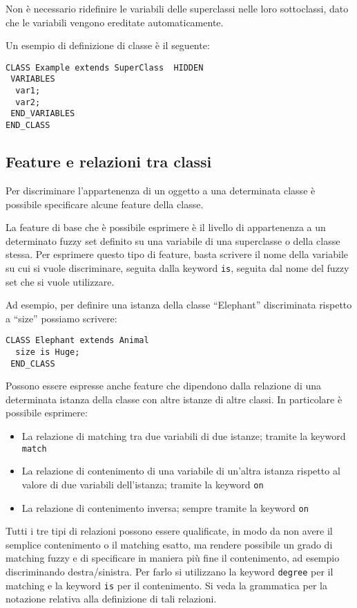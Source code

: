 Non è necessario ridefinire le variabili delle superclassi nelle loro sottoclassi, dato che le variabili vengono ereditate automaticamente.

Un esempio di definizione di classe è il seguente:

\begin{lstlisting}[language=fuzzyClassifier]
CLASS Example extends SuperClass  HIDDEN
 VARIABLES
  var1;
  var2;
 END_VARIABLES
END_CLASS
\end{lstlisting}


\subsection{Feature e relazioni tra classi}

Per discriminare l'appartenenza di un oggetto a una determinata classe è possibile specificare alcune feature della classe.

La feature di base che è possibile esprimere è il livello di appartenenza a un determinato fuzzy set definito su una variabile di una superclasse o della classe stessa. 
Per esprimere questo tipo di feature, basta scrivere il nome della variabile su cui si vuole discriminare, seguita dalla keyword \verb|is|, seguita dal nome del fuzzy set che si vuole utilizzare.

Ad esempio, per definire una istanza della classe ``Elephant'' discriminata rispetto a ``size'' possiamo scrivere:

\begin{lstlisting}[language=fuzzyClassifier]
 CLASS Elephant extends Animal
  size is Huge;
 END_CLASS
\end{lstlisting}


Possono essere espresse anche feature che dipendono dalla relazione di una determinata istanza della classe con altre istanze di altre classi.
In particolare è possibile esprimere:

\begin{itemize}
 \item La relazione di matching tra due variabili di due istanze; tramite la keyword \verb|match|
 \item La relazione di contenimento di una variabile di un'altra istanza rispetto al valore di due variabili dell'istanza; tramite la keyword \verb|on|
 \item La relazione di contenimento inversa; sempre tramite la keyword \verb|on|
\end{itemize}

Tutti i tre tipi di relazioni possono essere qualificate, in modo da non avere il semplice contenimento o il matching esatto, ma rendere possibile un grado di matching fuzzy e di specificare in maniera più fine il contenimento, ad esempio discriminando destra/sinistra. Per farlo si utilizzano la keyword \verb|degree| per il matching e la keyword \verb|is| per il contenimento. Si veda la grammatica per la notazione relativa alla definizione di tali relazioni.

